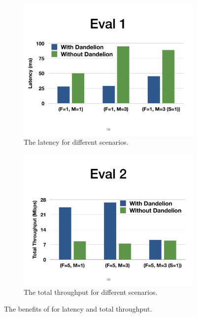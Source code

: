 \begin{figure}[!htbp]
\centering
\begin{subfigure}{0.48\linewidth}
      \centering\includegraphics[width=\linewidth]{figures/ss-eval1.pdf}
      \caption{\label{fig:eval1} \small The latency for different scenarios.}
\end{subfigure}
\begin{subfigure}{0.48\linewidth}
      \centering\includegraphics[width=\linewidth]{figures/ss-eval2.pdf}
      \caption{\label{fig:eval2} \small The total throughput for different scenarios.}
\end{subfigure}
\vspace{-2mm}
\caption{\small The benefits of \concept{} for latency and total throughput.}
\label{fig:eval12}
\end{figure}




